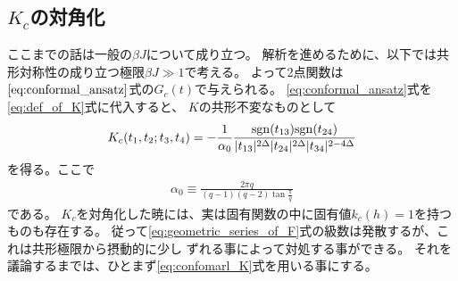 \subsection{$K_c$の対角化}
ここまでの話は一般の$\beta J$について成り立つ。
解析を進めるために、以下では共形対称性の成り立つ極限$\beta J \gg 1$で考える。
よって2点関数は$\eqref{eq:conformal_ansatz}$式の$G_c(t)$で与えられる。
\eqref{eq:conformal_ansatz}式を\eqref{eq:def_of_K}式に代入すると、
$K$の共形不変なものとして
\begin{align}
	K_c(t_1, t_2; t_3, t_4)
	= -\frac{1}{\alpha_0}
		\frac{\mathrm{sgn}(t_{13})\mathrm{sgn}(t_{24})}{|t_{13}|^{2\Delta}|t_{24}|^{2\Delta}|t_{34}|^{2-4\Delta}}
	\label{eq:confomarl_K}
\end{align}
を得る。ここで
\begin{align}
	\alpha_0 \equiv \frac{2\pi q}{(q-1)(q-2)\tan\frac{\pi}{q}}
	\label{eq:alpha_0}
\end{align}
である。
$K_c$を対角化した暁には、実は固有関数の中に固有値$k_c(h) = 1$を持つものも存在する。
従って\eqref{eq:geometric_series_of_F}式の級数は発散するが、これは共形極限から摂動的に少し
ずれる事によって対処する事ができる。
それを議論するまでは、ひとまず\eqref{eq:confomarl_K}式を用いる事にする。


